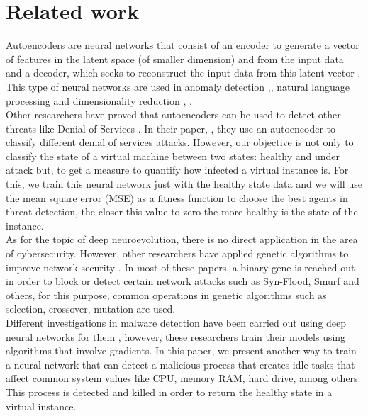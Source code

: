 \documentclass{iosart2c}
\begin{document}
\section{Related work}\label{relatedwork}

Autoencoders are neural networks that consist of an encoder to generate a vector of features in the latent space (of smaller dimension) and from the input data and a decoder, which seeks to reconstruct the input data from this latent vector \cite{autoencoders_nlp1}. This type of neural networks are used in anomaly detection \cite{anomaly1, anomaly3},\cite{anomaly4}, natural language processing \cite{autoencoders_nlp1} and dimensionality reduction \cite{dimred1}, \cite{dimred2}.\\

Other researchers have proved that autoencoders can be used to detect other threats like Denial of Services \cite{autoencoderdos}. In their paper, \citeauthor{autoencoderdos}, they use an autoencoder to classify different denial of services attacks. However, our objective is not only to classify the state of a virtual machine between two states: healthy and under attack but, to get a measure to quantify how infected a virtual instance is. For this, we train this neural network just with the healthy state data and we will use the mean square error (MSE) as a fitness function to choose the best agents in threat detection, the closer this value to zero the more healthy is the state of the instance.\\

As for the topic of deep neuroevolution, there is no direct application in the area of cybersecurity. However, other researchers have applied genetic algorithms to improve network security \cite{GA1, GA2, GA3}. In most of these papers, a binary gene is reached out in order to block or detect certain network attacks such as Syn-Flood, Smurf and others, for this purpose, common operations in genetic algorithms such as selection, crossover, mutation are used.\\

Different investigations in malware detection have been carried out using deep neural networks for them \cite{malwarednn1, malwarednn2,malwarednn3}, however, these researchers train their models using algorithms that involve gradients. In this paper, we present another way to train a neural network that can detect a malicious process that creates idle tasks that affect common system values like CPU, memory RAM, hard drive, among others. This process is detected and killed in order to return the healthy state in a virtual instance.
\end{document}
